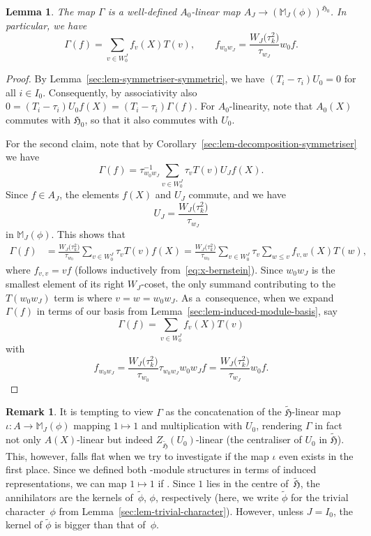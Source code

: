 \documentclass[pdftex]{sigma}
\newtheorem{Lemma}[Theorem]{Lemma}
\theoremstyle{definition}
\newtheorem{Remark}[Theorem]{Remark}
\numberwithin{equation}{section}
\begin{document}
\begin{Lemma}\label{sec:lem-Gamma-invariant-highest-term}
 The map $\Gamma$ is a well-defined $A_0$-linear map
 $A_J\to (\mathbb{M}_J(\phi))^{\mathfrak{H}_0}$.
 In particular, we have
 \[
 \Gamma(f) = \sum_{v\in W_0^J} f_v(X) T(v),\qquad f_{w_0w_J}=\frac{W_J\bigl(\tau_k^2\bigr)}{\tau_{w_J}} w_0f.
 \]
\end{Lemma}
\begin{proof}
 By Lemma~\ref{sec:lem-symmetriser-symmetric}, we have $(T_i-\tau_i)U_0=0$ for all $i\in I_0$. Consequently,
 by associativity also
$0 = (T_i-\tau_i)U_0 f(X) = (T_i-\tau_i)\Gamma(f)$.
 For $A_0$-linearity, note that $A_0(X)$ commutes with
 $\mathfrak{H}_0$, so that it also commutes with $U_0$.

 For the second claim, note that by Corollary~\ref{sec:lem-decomposition-symmetriser} we have
 \[
 \Gamma(f) = \tau_{w_0w_J}^{-1} \sum_{v\in W_0^J} \tau_v T(v)
 U_J f(X).
 \]
 Since $f\in A_J$, the elements $f(X)$ and $U_J$ commute, and we have
 \[
 U_J = \frac{W_J\bigl(\tau_k^2\bigr)}{\tau_{w_J}}
 \]
 in $\mathbb{M}_J(\phi)$. This shows that
 \begin{align*}
 \Gamma(f)
 &= \frac{W_J\bigl(\tau_k^2\bigr)}{\tau_{w_0}} \sum_{v\in W_0^J} \tau_v T(v)
 f(X)= \frac{W_J\bigl(\tau_k^2\bigr)}{\tau_{w_0}} \sum_{v\in W_0^J} \tau_v
 \sum_{w\le v} f_{v,w}(X) T(w),
 \end{align*}
 where $f_{v,v} = v f$ (follows inductively from~\eqref{eq:x-bernstein}). Since $w_0w_J$ is the smallest element of its right
 $W_J$-coset, the only summand contributing to the $T(w_0w_J)$ term
 is where $v=w=w_0w_J$. As a~consequence, when we expand $\Gamma(f)$ in
 terms of our basis from Lemma~\ref{sec:lem-induced-module-basis},
 say
 \[
 \Gamma(f) = \sum_{v\in W_0^J} f_v(X)T(v)
 \]
 with
 \[
 f_{w_0w_J} = \frac{W_J\bigl(\tau_k^2\bigr)}{\tau_{w_0}} \tau_{w_0w_J}
 w_0w_J f = \frac{W_J\bigl(\tau_k^2\bigr)}{\tau_{w_J}} w_0 f.\tag*{\qed}
 \]\renewcommand{\qed}{}
\end{proof}

\begin{Remark}\label{sec:rk-htilde-intertwiner}
 It is tempting to view $\Gamma$ as the concatenation of
 the $\tilde{\mathfrak{H}}$-linear map $\iota\colon A\to\mathbb{M}_J(\phi)$ mapping $1\mapsto 1$ and multiplication with $U_0$, rendering $\Gamma$ in fact
 not only $A(X)$-linear but indeed $Z_{\tilde{\mathfrak{H}}}(U_0)$-linear \big(the centraliser of $U_0$ in $\tilde{\mathfrak{H}}$\big).
 This, however, falls flat when we try to investigate if the map $\iota$
 even exists in the first place. Since we defined both -module structures
 in terms of induced representations, we can map $1\mapsto 1$ if
 .
 Since $1$ lies in the centre of~$\tilde{\mathfrak{H}}$, the annihilators
 are the kernels of~$\tilde{\phi}$, $\phi$, respectively (here, we write
 $\tilde{\phi}$ for the trivial character~$\phi$ from Lemma~\ref{sec:lem-trivial-character}). However, unless
 $J=I_0$, the kernel of $\tilde{\phi}$ is bigger
 than that of~$\phi$.
\end{Remark}
\end{document}
